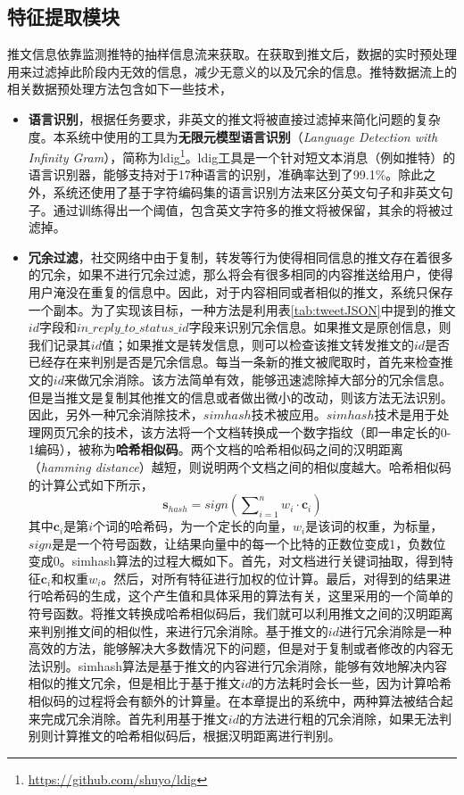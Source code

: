 \subsection{特征提取模块}
\label{subsec2:feaureExtraction}
推文信息依靠监测推特的抽样信息流来获取。在获取到推文后，数据的实时预处理用来过滤掉此阶段内无效的信息，减少无意义的以及冗余的信息。推特数据流上的相关数据预处理方法包含如下一些技术，
\begin{itemize}
  \item \textbf{语言识别}，根据任务要求，非英文的推文将被直接过滤掉来简化问题的复杂度。本系统中使用的工具为\textbf{无限元模型语言识别}（\textit{Language Detection with Infinity Gram}），简称为ldig\footnote{\url{https://github.com/shuyo/ldig}}。ldig工具是一个针对短文本消息（例如推特）的语言识别器，能够支持对于17种语言的识别，准确率达到了99.1\%。除此之外，系统还使用了基于字符编码集的语言识别方法来区分英文句子和非英文句子。通过训练得出一个阈值，包含英文字符多的推文将被保留，其余的将被过滤掉。
  \item \textbf{冗余过滤}，社交网络中由于复制，转发等行为使得相同信息的推文存在着很多的冗余，如果不进行冗余过滤，那么将会有很多相同的内容推送给用户，使得用户淹没在重复的信息中。因此，对于内容相同或者相似的推文，系统只保存一个副本。为了实现该目标，一种方法是利用表\ref{tab:tweetJSON}中提到的推文$id$字段和$in\_reply\_to\_status\_id$字段来识别冗余信息。如果推文是原创信息，则我们记录其$id$值；如果推文是转发信息，则可以检查该推文转发推文的$id$是否已经存在来判别是否是冗余信息。每当一条新的推文被爬取时，首先来检查推文的$id$来做冗余消除。该方法简单有效，能够迅速滤除掉大部分的冗余信息。但是当推文是复制其他推文的信息或者做出微小的改动，则该方法无法识别。因此，另外一种冗余消除技术，$simhash$技术被应用。$simhash$技术是用于处理网页冗余的技术，该方法将一个文档转换成一个数字指纹（即一串定长的0-1编码），被称为\textbf{哈希相似码}。两个文档的哈希相似码之间的汉明距离（\textit{hamming distance}）越短，则说明两个文档之间的相似度越大。哈希相似码的计算公式如下所示，
  \begin{equation}
  \label{simhash}
    {\mathbf{s}_{hash}} = sign(\sum\nolimits_{i = 1}^n {{w_i} \cdot {\mathbf{c}_i}} )
  \end{equation}
其中$\mathbf{c}_i$是第$i$个词的哈希码，为一个定长的向量，$w_i$是该词的权重，为标量，$sign$是是一个符号函数，让结果向量中的每一个比特的正数位变成1，负数位变成0。simhash算法的过程大概如下。首先，对文档进行关键词抽取，得到特征$\mathbf{c}_i$和权重$w_i$。然后，对所有特征进行加权的位计算。最后，对得到的结果进行哈希码的生成，这个产生值和具体采用的算法有关，这里采用的一个简单的符号函数。将推文转换成哈希相似码后，我们就可以利用推文之间的汉明距离来判别推文间的相似性，来进行冗余消除。基于推文的$id$进行冗余消除是一种高效的方法，能够解决大多数情况下的问题，但是对于复制或者修改的内容无法识别。simhash算法是基于推文的内容进行冗余消除，能够有效地解决内容相似的推文冗余，但是相比于基于推文$id$的方法耗时会长一些，因为计算哈希相似码的过程将会有额外的计算量。在本章提出的系统中，两种算法被结合起来完成冗余消除。首先利用基于推文$id$的方法进行粗的冗余消除，如果无法判别则计算推文的哈希相似码后，根据汉明距离进行判别。
\end{itemize}


